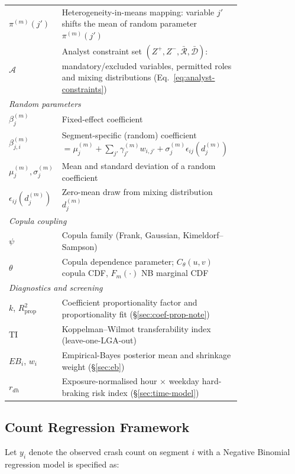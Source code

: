 \documentclass[letterpaper,8pt]{extarticle}  %
\begin{document}
\begin{doublespacing}
\begin{linenumbers}
\begin{table}[!ht]
\begin{center}
\begin{tabular}{lp{0.78\linewidth}}
      $\pi^{(m)}(j')$ & Heterogeneity-in-means mapping: variable $j'$ shifts the mean of random parameter $\pi^{(m)}(j')$ \\
      $\mathcal{A}$ & Analyst constraint set $(Z^{+}, Z^{-}, \bar{\mathcal{R}}, \bar{\mathcal{D}})$: mandatory/excluded variables, permitted roles and mixing distributions (Eq.~\eqref{eq:analyst-constraints}) \\
      \multicolumn{2}{l}{\emph{Random parameters}} \\
      $\beta_j^{(m)}$ & Fixed-effect coefficient \\
      $\beta_{j,i}^{(m)}$ & Segment-specific (random) coefficient $= \mu_j^{(m)} + \sum_{j'} \gamma_{j'}^{(m)} w_{i,j'} + \sigma_j^{(m)} \epsilon_{ij}(d_j^{(m)})$ \\
      $\mu_j^{(m)}, \sigma_j^{(m)}$ & Mean and standard deviation of a random coefficient \\
      $\epsilon_{ij}(d_j^{(m)})$ & Zero-mean draw from mixing distribution $d_j^{(m)}$ \\
      \multicolumn{2}{l}{\emph{Copula coupling}} \\
      $\psi$ & Copula family (Frank, Gaussian, Kimeldorf--Sampson) \\
      $\theta$ & Copula dependence parameter; $C_\theta(u,v)$ copula CDF, $F_m(\cdot)$ NB marginal CDF \\
      \multicolumn{2}{l}{\emph{Diagnostics and screening}} \\
      $k$, $R^2_{\text{prop}}$ & Coefficient proportionality factor and proportionality fit (\S\ref{sec:coef-prop-note}) \\
      TI & Koppelman--Wilmot transferability index (leave-one-LGA-out) \\
      $EB_i$, $w_i$ & Empirical-Bayes posterior mean and shrinkage weight (\S\ref{sec:eb}) \\
      $r_{dh}$ & Exposure-normalised hour $\times$ weekday hard-braking risk index (\S\ref{sec:time-model}) \\
      \bottomrule
    \end{tabular}
  \end{center}
\end{table}
\FloatBarrier
\subsection{Count Regression Framework}

Let $y_i$ denote the observed crash count on segment $i$ with a Negative Binomial regression model is specified as:


\end{linenumbers}
\end{doublespacing}
\end{document}
